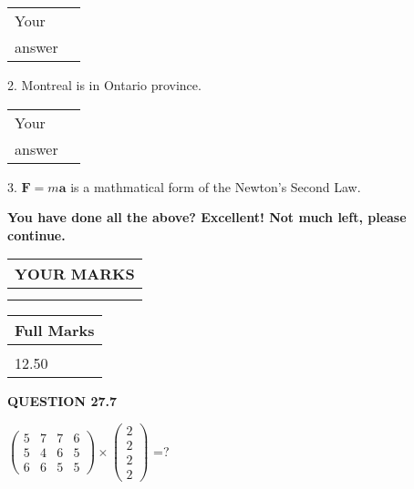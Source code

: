 \documentclass[12pt]{article}
\begin{document}
\noindent\begin{tabular}{|l|l|}\hline Your&\hspace{.2in} \\ answer&\hspace{.2in} \\ \hline \end{tabular}
2.  %
Montreal is in  %
Ontario province.
 
\noindent\begin{tabular}{|l|l|}\hline Your&\hspace{.2in} \\ answer&\hspace{.2in} \\ \hline \end{tabular}
3.  %
$\mathbf{F}=m\mathbf{a}$ is a mathmatical form of
the Newton's Second Law.
 

 
\vspace{0.3in}
   
   
\vspace{0.3in}
{\textbf{\LARGE{You have done all the above? Excellent! Not much left, please continue.}}}
\vspace{0.3in}
   
   
  
\vspace{0.2in}
  
\noindent\begin{tabular}{|l|}
\hline
 YOUR MARKS  \\
\hline
 \\ 
 \\ 
\hline
\end{tabular}
\hspace{0.05in} \begin{tabular}{|l|}
\hline
 Full Marks  \\
\hline
 \\ 
12.50 \\
\hline
\end{tabular}
{\textbf{\Large{QUESTION
27.7 
}}}
  
  
 
$ \left( \begin{array}{ccccccccc}
           5 & 
           7 & 
           7 & 
           6 \\ 
           5 & 
           4 & 
           6 & 
           5 \\ 
           6 & 
           6 & 
           5 & 
           5
\end{array}\right) \times
\left( \begin{array}{c}
           2 \\ 
           2 \\ 
           2 \\ 
           2
\end{array}\right) $ =?
 
\end{document}

